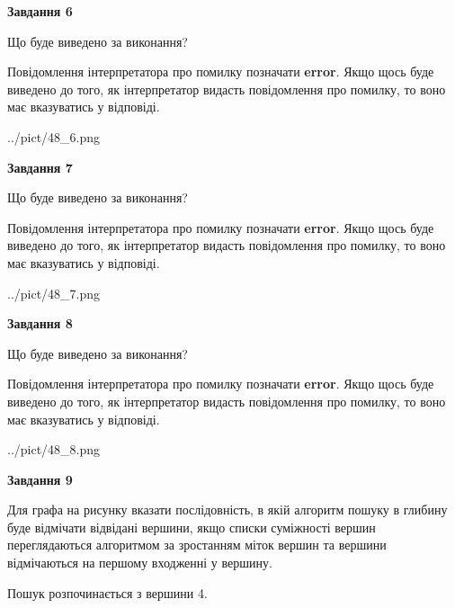 \documentclass[12pt, ukrainian]{article}
\begin{document}
{\begin {large}
{\begin {center}\textbf{Завдання 6}\end {center}}\par
Що буде виведено за виконання?

Повідомлення інтерпретатора про помилку позначати \textbf{error}.
Якщо щось буде виведено до того, як інтерпретатор видасть повідомлення про помилку, 
то воно має вказуватись у відповіді. \par


\begin{center}
	{../pict/48_6.png}
\end{center}
\newpage

{\begin {center}\textbf{Завдання 7}\end {center}}\par
Що буде виведено за виконання?

Повідомлення інтерпретатора про помилку позначати \textbf{error}.
Якщо щось буде виведено до того, як інтерпретатор видасть повідомлення про помилку, 
то воно має вказуватись у відповіді. \par


\begin{center}
	{../pict/48_7.png}
\end{center}
\newpage

{\begin {center}\textbf{Завдання 8}\end {center}}\par
Що буде виведено за виконання?

Повідомлення інтерпретатора про помилку позначати \textbf{error}.
Якщо щось буде виведено до того, як інтерпретатор видасть повідомлення про помилку, 
то воно має вказуватись у відповіді. \par


\begin{center}
	{../pict/48_8.png}
\end{center}
\newpage

{\begin {center}\textbf{Завдання 9}\end {center}}\par
Для графа на рисунку вказати послідовність, в якій алгоритм пошуку в глибину буде відмічати відвідані вершини, якщо списки суміжності вершин переглядаються алгоритмом за зростанням міток вершин та вершини відмічаються на першому вход\-женні у вершину.\par
Пошук розпочинається з вершини 4.\par


\end{large}}
\end{document}
